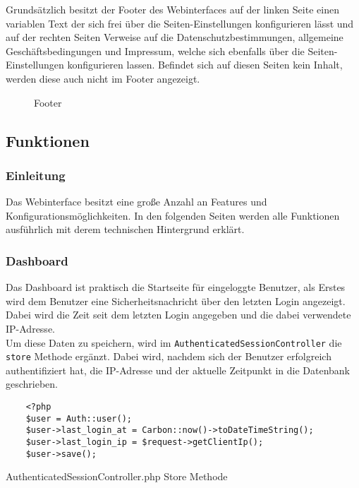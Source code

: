 Grundsätzlich besitzt der Footer des Webinterfaces auf der linken Seite
einen variablen Text der sich frei über die Seiten-Einstellungen konfigurieren
lässt und auf der rechten Seiten Verweise auf die Datenschutzbestimmungen,
allgemeine Geschäftsbedingungen und Impressum, welche sich ebenfalls über die
Seiten-Einstellungen konfigurieren lassen. Befindet sich auf diesen Seiten kein
Inhalt, werden diese auch nicht im Footer angezeigt.

\begin{figure}[H]
  \centering
  \caption{Footer}
\end{figure}

\subsection{Funktionen}
\subsubsection{Einleitung}
Das Webinterface besitzt eine große Anzahl an Features und
Konfigurationsmöglichkeiten. In den folgenden Seiten werden alle Funktionen
ausführlich mit derem technischen Hintergrund erklärt.

\subsubsection{Dashboard}
Das Dashboard ist praktisch die Startseite für eingeloggte Benutzer, als Erstes
wird dem Benutzer eine Sicherheitsnachricht über den letzten Login angezeigt.
Dabei wird die Zeit seit dem letzten Login angegeben und die dabei verwendete
IP-Adresse.\\

Um diese Daten zu speichern, wird im \verb|AuthenticatedSessionController| die
\verb|store| Methode ergänzt. Dabei wird, nachdem sich der Benutzer erfolgreich
authentifiziert hat, die IP-Adresse und der aktuelle Zeitpunkt in die Datenbank
geschrieben.

\begin{listing}[H]
  \begin{verbatim}
    <?php
    $user = Auth::user();
    $user->last_login_at = Carbon::now()->toDateTimeString();
    $user->last_login_ip = $request->getClientIp();
    $user->save();
  \end{verbatim}
  \caption{AuthenticatedSessionController.php Store Methode}
\end{listing}

